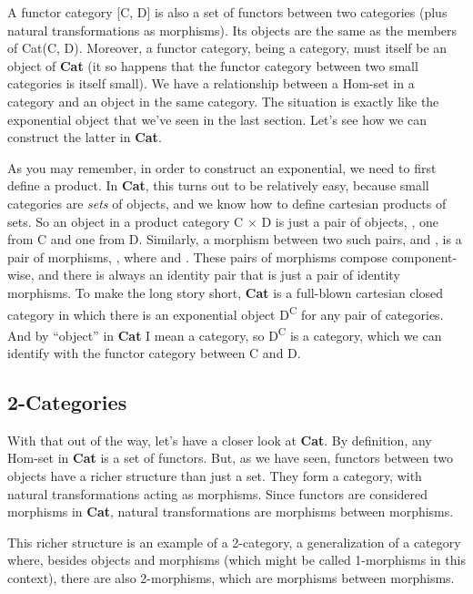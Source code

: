 A functor category {[}C, D{]} is also a set of functors between two
categories (plus natural transformations as morphisms). Its objects are
the same as the members of Cat(C, D). Moreover, a functor category,
being a category, must itself be an object of \textbf{Cat} (it so
happens that the functor category between two small categories is itself
small). We have a relationship between a Hom-set in a category and an
object in the same category. The situation is exactly like the
exponential object that we've seen in the last section. Let's see how we
can construct the latter in \textbf{Cat}.

As you may remember, in order to construct an exponential, we need to
first define a product. In \textbf{Cat}, this turns out to be relatively
easy, because small categories are \emph{sets} of objects, and we know
how to define cartesian products of sets. So an object in a product
category C × D is just a pair of objects, , one from C
and one from D. Similarly, a morphism between two such pairs,
 and , is a pair of
morphisms, , where
 and
. These pairs of morphisms
compose component-wise, and there is always an identity pair that is
just a pair of identity morphisms. To make the long story short,
\textbf{Cat} is a full-blown cartesian closed category in which there is
an exponential object D\textsuperscript{C} for any pair of categories.
And by ``object'' in \textbf{Cat} I mean a category, so
D\textsuperscript{C} is a category, which we can identify with the
functor category between C and D.

\subsection{2-Categories}\label{categories}

With that out of the way, let's have a closer look at \textbf{Cat}. By
definition, any Hom-set in \textbf{Cat} is a set of functors. But, as we
have seen, functors between two objects have a richer structure than
just a set. They form a category, with natural transformations acting as
morphisms. Since functors are considered morphisms in \textbf{Cat},
natural transformations are morphisms between morphisms.

This richer structure is an example of a 2-category, a generalization of
a category where, besides objects and morphisms (which might be called
1-morphisms in this context), there are also 2-morphisms, which are
morphisms between morphisms.

